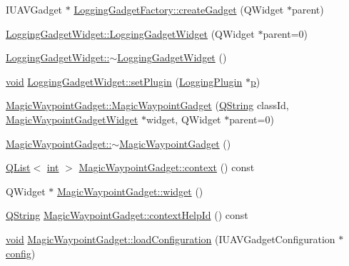 \begin{DoxyCompactItemize}
\item 
I\-U\-A\-V\-Gadget $\ast$ \hyperlink{group___g_c_s_control_gadget_plugin_ga95ee0680e9c323e77341bef36195bdf5}{Logging\-Gadget\-Factory\-::create\-Gadget} (Q\-Widget $\ast$parent)
\item 
\hyperlink{group___g_c_s_control_gadget_plugin_ga82895cf265acb40f6491abf90e3b018e}{Logging\-Gadget\-Widget\-::\-Logging\-Gadget\-Widget} (Q\-Widget $\ast$parent=0)
\item 
\hyperlink{group___g_c_s_control_gadget_plugin_gafa54fcc426f5064c9706b1528834d6a0}{Logging\-Gadget\-Widget\-::$\sim$\-Logging\-Gadget\-Widget} ()
\item 
\hyperlink{group___u_a_v_objects_plugin_ga444cf2ff3f0ecbe028adce838d373f5c}{void} \hyperlink{group___g_c_s_control_gadget_plugin_ga9ff08b035e0189200c2f5d2e2b234dac}{Logging\-Gadget\-Widget\-::set\-Plugin} (\hyperlink{class_logging_plugin}{Logging\-Plugin} $\ast$\hyperlink{glext_8h_aa5367c14d90f462230c2611b81b41d23}{p})
\item 
\hyperlink{group___g_c_s_control_gadget_plugin_ga7c890e89a9d75c8e6498c9b894ba70ce}{Magic\-Waypoint\-Gadget\-::\-Magic\-Waypoint\-Gadget} (\hyperlink{group___u_a_v_objects_plugin_gab9d252f49c333c94a72f97ce3105a32d}{Q\-String} class\-Id, \hyperlink{class_magic_waypoint_gadget_widget}{Magic\-Waypoint\-Gadget\-Widget} $\ast$widget, Q\-Widget $\ast$parent=0)
\item 
\hyperlink{group___g_c_s_control_gadget_plugin_ga7caf437fa3df4fc4c30bb259b16d5b89}{Magic\-Waypoint\-Gadget\-::$\sim$\-Magic\-Waypoint\-Gadget} ()
\item 
\hyperlink{class_q_list}{Q\-List}$<$ \hyperlink{ioapi_8h_a787fa3cf048117ba7123753c1e74fcd6}{int} $>$ \hyperlink{group___g_c_s_control_gadget_plugin_ga7521519a1bb7dd420c9e4d2f1bf49a2f}{Magic\-Waypoint\-Gadget\-::context} () const 
\item 
Q\-Widget $\ast$ \hyperlink{group___g_c_s_control_gadget_plugin_ga361c7a72cf1a95a2cf36f858d5b9bee5}{Magic\-Waypoint\-Gadget\-::widget} ()
\item 
\hyperlink{group___u_a_v_objects_plugin_gab9d252f49c333c94a72f97ce3105a32d}{Q\-String} \hyperlink{group___g_c_s_control_gadget_plugin_gab2c239e4a2ee9921f9c9c0c79f769c3e}{Magic\-Waypoint\-Gadget\-::context\-Help\-Id} () const 
\item 
\hyperlink{group___u_a_v_objects_plugin_ga444cf2ff3f0ecbe028adce838d373f5c}{void} \hyperlink{group___g_c_s_control_gadget_plugin_ga163d222d9f3681fe93e07da2800e97ae}{Magic\-Waypoint\-Gadget\-::load\-Configuration} (I\-U\-A\-V\-Gadget\-Configuration $\ast$\hyperlink{deflate_8c_a4473b5227787415097004fd39f55185e}{config})

\end{DoxyCompactItemize}
